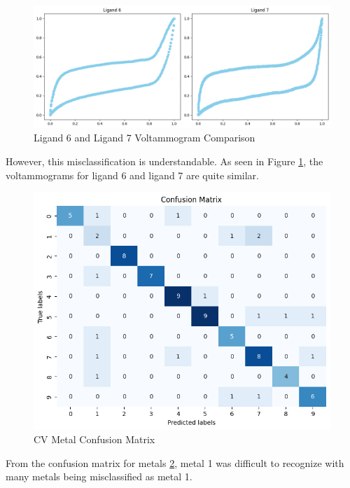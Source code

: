 \begin{figure}[h!]
  \centering
    \includegraphics[width=1.0\textwidth]{figures/ligand_comparison.png}
    \caption{Ligand 6 and Ligand 7 Voltammogram Comparison}
    \label{ligand_comparison}
\end{figure}
However, this misclassification is understandable. As seen in Figure \ref{ligand_comparison}, the voltammograms for ligand 6 and ligand 7 are quite similar. 
\begin{figure}[h!]
  \centering
    \includegraphics[width=1.0\textwidth]{figures/cv_metal_matrix.png}
    \caption{CV Metal Confusion Matrix}
    \label{cv_metal_matrix}
\end{figure}
From the confusion matrix for metals \ref{cv_metal_matrix}, metal 1 was difficult to recognize with many metals being misclassified as metal 1. 
